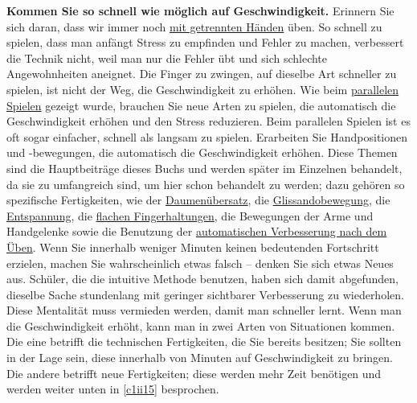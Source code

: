 \textbf{Kommen Sie so schnell wie möglich auf Geschwindigkeit.} Erinnern Sie sich daran, dass wir immer noch \hyperref[c1ii7]{mit getrennten Händen} üben.
So schnell zu spielen, dass man anfängt Stress zu empfinden und Fehler zu machen, verbessert die Technik nicht, weil man nur die Fehler übt und sich schlechte Angewohnheiten aneignet.
Die Finger zu zwingen, auf dieselbe Art schneller zu spielen, ist nicht der Weg, die Geschwindigkeit zu erhöhen.
Wie beim \hyperref[c1ii11]{parallelen Spielen} gezeigt wurde, brauchen Sie neue Arten zu spielen, die automatisch die Geschwindigkeit erhöhen und den Stress reduzieren.
Beim parallelen Spielen ist es oft sogar einfacher, schnell als langsam zu spielen.
Erarbeiten Sie Handpositionen und -bewegungen, die automatisch die Geschwindigkeit erhöhen.
Diese Themen sind die Hauptbeiträge dieses Buchs und werden später im Einzelnen behandelt, da sie zu umfangreich sind, um hier schon behandelt zu werden; dazu gehören so spezifische Fertigkeiten, wie der \hyperref[c1iii5b]{Daumenübersatz}, die \hyperref[c1iii5c]{Glissandobewegung}, die \hyperref[c1ii14]{Entspannung}, die \hyperref[c1iii4b]{flachen Fingerhaltungen}, die Bewegungen der Arme und Handgelenke sowie die Benutzung der \hyperref[c1ii15]{automatischen Verbesserung nach dem Üben}.
Wenn Sie innerhalb weniger Minuten keinen bedeutenden Fortschritt erzielen, machen Sie wahrscheinlich etwas falsch -- denken Sie sich etwas Neues aus.
Schüler, die die intuitive Methode benutzen, haben sich damit abgefunden, dieselbe Sache stundenlang mit geringer sichtbarer Verbesserung zu wiederholen.
Diese Mentalität muss vermieden werden, damit man schneller lernt.
Wenn man die Geschwindigkeit erhöht, kann man in zwei Arten von Situationen kommen.
Die eine betrifft die technischen Fertigkeiten, die Sie bereits besitzen; Sie sollten in der Lage sein, diese innerhalb von Minuten auf Geschwindigkeit zu bringen.
Die andere betrifft neue Fertigkeiten; diese werden mehr Zeit benötigen und werden weiter unten in \hyperref[c1ii15]{\autoref{c1ii15}} besprochen.

